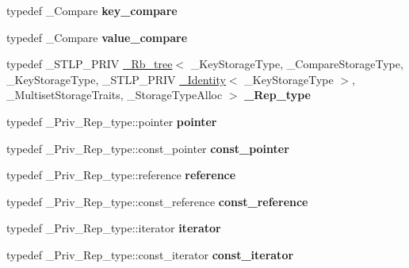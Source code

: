 \begin{DoxyCompactItemize}
\mbox{\label{classmultiset_a8f80659e29ec51aebdad4a928af501a7}} 
typedef \+\_\+\+Compare {\bfseries key\+\_\+compare}
\item 
\mbox{\label{classmultiset_a12f507d10a4cc60d0f21402e72c902c2}} 
typedef \+\_\+\+Compare {\bfseries value\+\_\+compare}
\item 
\mbox{\label{classmultiset_ab0d9890dbff79b436b80b3dc30f69820}} 
typedef \+\_\+\+S\+T\+L\+P\+\_\+\+P\+R\+IV \hyperlink{class___rb__tree}{\+\_\+\+Rb\+\_\+tree}$<$ \+\_\+\+Key\+Storage\+Type, \+\_\+\+Compare\+Storage\+Type, \+\_\+\+Key\+Storage\+Type, \+\_\+\+S\+T\+L\+P\+\_\+\+P\+R\+IV \hyperlink{struct___identity}{\+\_\+\+Identity}$<$ \+\_\+\+Key\+Storage\+Type $>$, \+\_\+\+Multiset\+Storage\+Traits, \+\_\+\+Storage\+Type\+Alloc $>$ {\bfseries \+\_\+\+Rep\+\_\+type}
\item 
\mbox{\label{classmultiset_aca257b678c0c6d7f23f5cb9d719cb50c}} 
typedef \+\_\+\+Priv\+\_\+\+Rep\+\_\+type\+::pointer {\bfseries pointer}
\item 
\mbox{\label{classmultiset_a5ee1d28a347bfd501a5a59cbaa9d4cab}} 
typedef \+\_\+\+Priv\+\_\+\+Rep\+\_\+type\+::const\+\_\+pointer {\bfseries const\+\_\+pointer}
\item 
\mbox{\label{classmultiset_a1400da13295084da10a2e863e90ed8a1}} 
typedef \+\_\+\+Priv\+\_\+\+Rep\+\_\+type\+::reference {\bfseries reference}
\item 
\mbox{\label{classmultiset_a276cfa99e97a15ed7238ab85ede420b5}} 
typedef \+\_\+\+Priv\+\_\+\+Rep\+\_\+type\+::const\+\_\+reference {\bfseries const\+\_\+reference}
\item 
\mbox{\label{classmultiset_a15f409667c5b7758dead07dc690b09cd}} 
typedef \+\_\+\+Priv\+\_\+\+Rep\+\_\+type\+::iterator {\bfseries iterator}
\item 
\mbox{\label{classmultiset_a8647052869d8019ec41ae09d76eae50d}} 
typedef \+\_\+\+Priv\+\_\+\+Rep\+\_\+type\+::const\+\_\+iterator {\bfseries const\+\_\+iterator}
\item 
\mbox{\label{classmultiset_a5695c7e86eecf2adfa5d8338e264b47d}} 

\end{DoxyCompactItemize}
